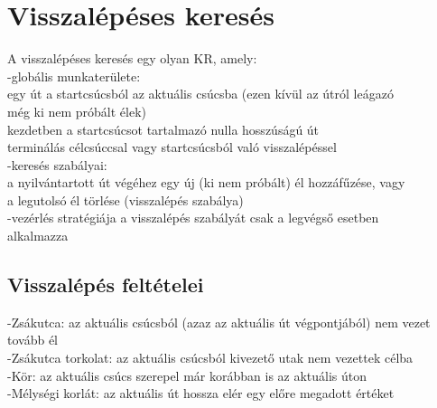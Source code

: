 \documentclass{article}
\begin{document}
	 \section{Visszalépéses keresés}
	 A visszalépéses keresés egy olyan KR, amely:\\
	 \hspace*{1em} -globális munkaterülete:\\
	 \hspace*{2em} egy út a startcsúcsból az aktuális csúcsba (ezen kívül az útról leágazó \\
	 \hspace*{2em} még ki nem próbált élek)\\
	 \hspace*{3em} kezdetben a startcsúcsot tartalmazó nulla hosszúságú út\\
	 \hspace*{3em} terminálás célcsúccsal vagy startcsúcsból való visszalépéssel\\
	 \hspace*{1em} -keresés szabályai:\\
	 \hspace*{2em} a nyilvántartott út végéhez egy új (ki nem próbált) él hozzáfűzése, vagy\\
	 \hspace*{2em} a legutolsó él törlése (visszalépés szabálya)\\
	 \hspace*{1em} -vezérlés stratégiája a visszalépés szabályát csak a legvégső esetben\\
	 \hspace*{1em}  alkalmazza\\
	 
	 \subsection{Visszalépés feltételei}
	 -Zsákutca: az aktuális csúcsból (azaz az aktuális út végpontjából) nem vezet\\
	 \hspace*{1em} tovább él\\
	 -Zsákutca torkolat: az aktuális csúcsból kivezető utak nem vezettek célba\\
	 -Kör: az aktuális csúcs szerepel már korábban is az aktuális úton\\
	 -Mélységi korlát: az aktuális út hossza elér egy előre megadott értéket
	 
	 \newpage
\end{document}

